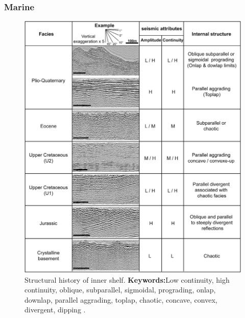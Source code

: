 \subsubsection{Marine}
\begin{figure}[ht!]
    \centering
    \includegraphics[width=0.9\linewidth]{Figures/0.2GPR/Kaci2024_shelf.png}
    \caption[Structural history of inner shelf.]{Structural history of inner shelf. \textbf{Keywords:}Low continuity, high continuity, oblique, subparallel, sigmoidal, prograding, onlap, downlap, parallel aggrading, toplap, chaotic, concave, convex, divergent, dipping \citep{Kaci2024}.}
    \label{fig:Kaci2024-1}
\end{figure}

